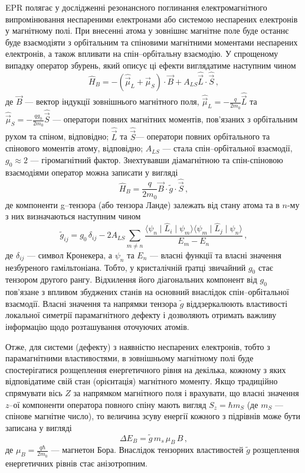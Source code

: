 \documentclass[10pt,a5paper,titlepage,oneside]{book}
\numberwithin{equation}{part}
\begin{document}
EPR полягає у дослідженні резонансного поглинання електромагнітного випромінювання неспареними
електронами або системою неспарених електронів у магнітному полі.
При внесенні атома у зовнішнє магнітне поле буде
останнє буде взаємодіяти з орбітальним та спіновими магнітними моментами
неспарених електронів, а також впливати на спін--орбітальну взаємодію.
У спрощеному випадку оператор збурень, який описує ці ефекти виглядатиме наступним чином
\begin{equation}
\hat{H}_B=-(\hat{\vec{\mu}}_L+\hat{\vec{\mu}}_S)\cdot\vec{B}+A_{LS}\hat{\vec{L}}\cdot\hat{\vec{S}}\,,
\end{equation}
де
$\vec{B}$ --- вектор індукції зовнішнього магнітного поля,
$\hat{\vec{\mu}}_L=-\frac{q}{2m_0}\hat{\vec{L}}$ та
$\hat{\vec{\mu}}_S=-\frac{qg_0}{2m_0}\hat{\vec{S}}$
--- оператори повних магнітних моментів, пов'язаних з орбітальним рухом та спіном,
відповідно;
$\hat{\vec{L}}$ та $\hat{\vec{S}}$--- оператори повних орбітального та спінового моментів атому, відповідно;
$A_{LS}$ --- стала спін--орбітальної взаємодії,
$g_0\!\approx\!2$ --- гіромагнітний фактор.
Знехтувавши діамагнітною та спін-спіновою взаємодіями оператор можна записати у
вигляді \cite{tuomisto2019}
\begin{equation}
\hat{H}_B=\frac{q}{2m_0}\vec{B}\cdot\tilde{g}\cdot\hat{\vec{S}}\,,
\end{equation}
де компоненти g--тензора (або тензора Ланде) залежать від стану
атома та в $n$-му з них визначаються наступним чином
\begin{equation}
\tilde{g}_{ij}=g_0\,\delta_{ij}-2A_{LS}\sum_{m\neq n}\frac{\langle\psi_n\mid\hat{L}_i\mid\psi_m\rangle
\langle\psi_m\mid\hat{L}_j\mid\psi_n\rangle}{E_m-E_n}\,,
\end{equation}
де
$\delta_{ij}$ --- символ Кронекера, а
$\psi_n$ та $E_n$ --- власні функції та власні значення незбуреного гамільтоніана.
Тобто, у кристалічній ґратці звичайний $g_0$ стає тензором другого рангу.
Відхилення його діагональних компонент  від $g_0$ пов'язане з впливом
збуджених станів на основний внаслідок спін--орбітальної взаємодії.
Власні значення та напрямки тензора $\tilde{g}$ віддзеркалюють
властивості локальної симетрії парамагнітного дефекту і дозволяють отримать
важливу інформацію щодо розташування оточуючих атомів.



Отже, для системи (дефекту) з наявністю неспарених електронів,
тобто з парамагнітними властивостями, в зовнішньому магнітному полі
буде спостерігатися розщеплення енергетичного рівня на декілька,
кожному з яких відповідатиме свій стан (орієнтація)
магнітного моменту.
Якщо традиційно спрямувати вісь $Z$ за напрямком магнітного поля і
врахувати, що власні значення $z$--ої компоненти оператора повного спіну
мають вигляд $S_z=\hbar m_S$
(де $m_S$ --- спінове магнітне число), то величина зсуву енергії кожного з підрівнів може бути записана у вигляді
\begin{equation}
\Delta E_B=\tilde{g}\,m_s\, \mu_B\,B\,,
\end{equation}
де
$\mu_B=\frac{q\hbar}{2m_0}$ --- магнетон Бора.
Внаслідок тензорних властивостей $\tilde{g}$ розщеплення енергетичних
рівнів стає анізотропним.
\end{document}

